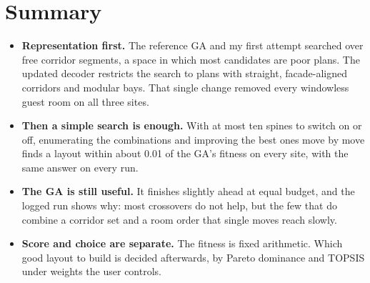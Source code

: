 \documentclass[10pt,a4paper]{article}
\begin{document}
\section{Summary}
\begin{itemize}
\item \textbf{Representation first.} The reference GA and my first attempt searched over free corridor segments, a
space in which most candidates are poor plans. The updated decoder restricts the search to plans with straight,
facade-aligned corridors and modular bays. That single change removed every windowless guest room on all three sites.
\item \textbf{Then a simple search is enough.} With at most ten spines to switch on or off, enumerating the
combinations and improving the best ones move by move finds a layout within about 0.01 of the GA's fitness on every
site, with the same answer on every run.
\item \textbf{The GA is still useful.} It finishes slightly ahead at equal budget, and the logged run shows why: most
crossovers do not help, but the few that do combine a corridor set and a room order that single moves reach slowly.
\item \textbf{Score and choice are separate.} The fitness is fixed arithmetic. Which good layout to build is decided
afterwards, by Pareto dominance and TOPSIS under weights the user controls.
\end{itemize}

\appendix
\end{document}

